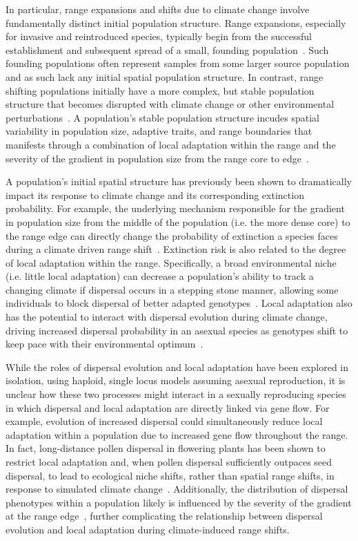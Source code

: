 \documentclass[12pt, oneside]{article}
\begin{document}
In particular, range expansions and shifts due to climate change involve fundamentally distinct initial population structure. Range expansions, especially for invasive and reintroduced species, typically begin from the successful establishment and subsequent spread of a small, founding population~\citep{hastings2005spatial}. Such founding populations often represent samples from some larger source population and as such lack any initial spatial population structure. In contrast, range shifting populations initially have a more complex, but stable population structure that becomes disrupted with climate change or other environmental perturbations~\citep{hargreaves2014evolution}. A population's stable population structure incudes spatial variability in population size, adaptive traits, and range boundaries that manifests through a combination of local adaptation within the range and the severity of the gradient in population size from the range core to edge~\citep{hargreaves2014evolution, hargreaves2015fitness, henry2013eco}. 

A population's initial spatial structure has previously been shown to dramatically impact its response to climate change and its corresponding extinction probability. For example, the underlying mechanism responsible for the gradient in population size from the middle of the population (i.e. the more dense core) to the range edge can directly change the probability of extinction a species faces during a climate driven range shift~\citep{henry2013eco}. Extinction risk is also related to the degree of local adaptation within the range. Specifically, a broad environmental niche (i.e. little local adaptation) can decrease a population's ability to track a changing climate if dispersal occurs in a stepping stone manner, allowing some individuals to block dispersal of better adapted genotypes~\citep{atkins2010local}. Local adaptation also has the potential to interact with dispersal evolution during climate change, driving increased dispersal probability in an asexual species as genotypes shift to keep pace with their environmental optimum~\citep{hargreaves2015fitness}. 

While the roles of dispersal evolution and local adaptation have been explored in isolation, using haploid, single locus models assuming asexual reproduction, it is unclear how these two processes might interact in a sexually reproducing species in which dispersal and local adaptation are directly linked via gene flow. For example, evolution of increased dispersal could simultaneously reduce local adaptation within a population due to increased gene flow throughout the range. In fact, long-distance pollen dispersal in flowering plants has been shown to restrict local adaptation and, when pollen dispersal sufficiently outpaces seed dispersal, to lead to ecological niche shifts, rather than spatial range shifts, in response to simulated climate change~\citep{aguilee2016pollen}. Additionally, the distribution of dispersal phenotypes within a population likely is influenced by the severity of the gradient at the range edge~\citep{henry2013eco, hargreaves2014evolution}, further complicating the relationship between dispersal evolution and local adaptation during climate-induced range shifts. 
\end{document}
